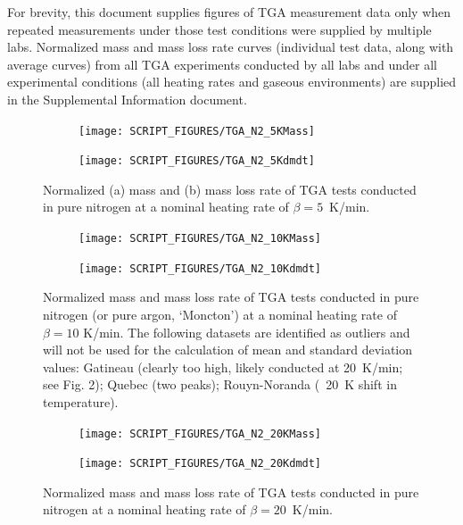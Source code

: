 \documentclass{book}
\begin{document}
For brevity, this document supplies figures of TGA measurement data only when repeated measurements under those test conditions were supplied by multiple labs. Normalized mass and mass loss rate curves (individual test data, along with average curves) from all TGA experiments conducted by all labs and under all experimental conditions (all heating rates and gaseous environments) are supplied in the Supplemental Information document.

\begin{figure}
\centering
\begin{subfigure}[b]{0.85\textwidth}
   \texttt{[image: SCRIPT\_FIGURES/TGA\_N2\_5KMass]}
   \caption{}
   \label{Fig:TGA_N2_5KMass} 
\end{subfigure}

\begin{subfigure}[b]{0.85\textwidth}
   \texttt{[image: SCRIPT\_FIGURES/TGA\_N2\_5Kdmdt]}
   \caption{}
   \label{Fig:TGA_N2_5Kdmdt} 
\end{subfigure}
  
  \caption{Normalized (a) mass and (b) mass loss rate of TGA tests conducted in pure nitrogen at a nominal heating rate of $\beta=5$~K/min.}
  \label{Fig:TGA_N2_5K}
\end{figure}

\begin{figure}
\centering
\begin{subfigure}[b]{0.85\textwidth}
   \texttt{[image: SCRIPT\_FIGURES/TGA\_N2\_10KMass]}
   \caption{}
   \label{Fig:TGA_N2_10KMass} 
\end{subfigure}

\begin{subfigure}[b]{0.85\textwidth}
   \texttt{[image: SCRIPT\_FIGURES/TGA\_N2\_10Kdmdt]}
   \caption{}
   \label{Fig:TGA_N2_10Kdmdt} 
\end{subfigure}
  
  \caption{Normalized mass and mass loss rate of TGA tests conducted in pure nitrogen (or pure argon, ‘Moncton’) at a nominal heating rate of $\beta = 10$ K/min. The following datasets are identified as outliers and will not be used for the calculation of mean and standard deviation values: Gatineau (clearly too high, likely conducted at 20~K/min; see Fig. 2); Quebec (two peaks); Rouyn-Noranda (~20~K shift in temperature).}
  \label{Fig:TGA_N2_10K}
\end{figure}

\begin{figure}
\centering
\begin{subfigure}[b]{0.85\textwidth}
   \texttt{[image: SCRIPT\_FIGURES/TGA\_N2\_20KMass]}
   \caption{}
   \label{Fig:TGA_N2_20KMass} 
\end{subfigure}

\begin{subfigure}[b]{0.85\textwidth}
   \texttt{[image: SCRIPT\_FIGURES/TGA\_N2\_20Kdmdt]}
   \caption{}
   \label{Fig:TGA_N2_20Kdmdt} 
\end{subfigure}
  
  \caption{Normalized mass and mass loss rate of TGA tests conducted in pure nitrogen at a nominal heating rate of $\beta=20$~K/min.}
  \label{Fig:TGA_N2_20K}
\end{figure}
\end{document}
